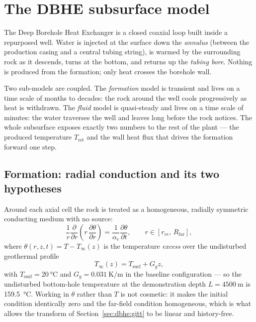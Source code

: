 \section{The DBHE subsurface model}
\label{sec:dbhe}

The Deep Borehole Heat Exchanger is a closed coaxial loop built inside a
repurposed well. Water is injected at the surface down the \emph{annulus}
(between the production casing and a central tubing string), is warmed by the
surrounding rock as it descends, turns at the bottom, and returns up the
\emph{tubing bore}. Nothing is produced from the formation; only heat crosses
the borehole wall.

Two sub-models are coupled. The \emph{formation} model is transient and lives on
a time scale of months to decades: the rock around the well cools progressively
as heat is withdrawn. The \emph{fluid} model is quasi-steady and lives on a time
scale of minutes: the water traverses the well and leaves long before the rock
notices. The whole subsurface exposes exactly two numbers to the rest of the
plant --- the produced temperature $T_{\mathrm{ret}}$ and the wall heat flux
that drives the formation forward one step.

\subsection{Formation: radial conduction and its two hypotheses}
\label{sec:dbhe:formation}

Around each axial cell the rock is treated as a homogeneous, radially symmetric
conducting medium with no source:
\begin{equation}
\frac{1}{r}\frac{\partial}{\partial r}\!\left(r\,\frac{\partial\theta}{\partial r}\right)
=\frac{1}{\alpha_e}\frac{\partial\theta}{\partial t}, \qquad
r\in[r_{ce},\,R_{\mathrm{far}}],
\label{eq:dbhe:radial}
\end{equation}
where $\theta(r,z,t)=T-T_\infty(z)$ is the temperature \emph{excess} over the
undisturbed geothermal profile
\begin{equation}
T_\infty(z)=T_{\mathrm{surf}}+G_g z ,
\label{eq:dbhe:Tinf}
\end{equation}
with $T_{\mathrm{surf}}=\SI{20}{\celsius}$ and $G_g=\SI{0.031}{\kelvin\per\metre}$
in the baseline configuration --- so the undisturbed bottom-hole temperature at
the demonstration depth $L=\SI{4500}{\metre}$ is \SI{159.5}{\celsius}. Working
in $\theta$ rather than $T$ is not cosmetic: it makes the initial condition
identically zero and the far-field condition homogeneous, which is what allows
the transform of Section~\ref{sec:dbhe:gitt} to be linear and history-free.

